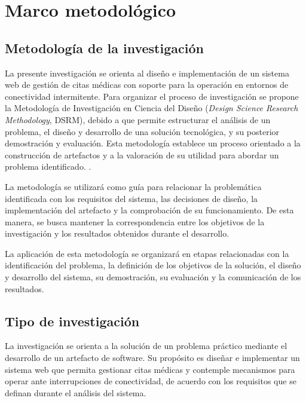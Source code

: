 
\section{Marco metodológico}
\label{sec:metodologia}

\subsection{Metodología de la investigación}

La presente investigación se orienta al diseño e implementación
de un sistema web de gestión de citas médicas con soporte para
la operación en entornos de conectividad intermitente. Para
organizar el proceso de investigación se propone la Metodología
de Investigación en Ciencia del Diseño
(\textit{Design Science Research Methodology}, DSRM), debido
a que permite estructurar el análisis de un problema, el diseño
y desarrollo de una solución tecnológica, y su posterior
demostración y evaluación. Esta metodología establece un proceso
orientado a la construcción de artefactos y a la valoración de
su utilidad para abordar un problema identificado.
\parencite{peffers2007dsrm}.

La metodología se utilizará como guía para relacionar la
problemática identificada con los requisitos del sistema, las
decisiones de diseño, la implementación del artefacto y la
comprobación de su funcionamiento. De esta manera, se busca
mantener la correspondencia entre los objetivos de la
investigación y los resultados obtenidos durante el desarrollo.

La aplicación de esta metodología se organizará en etapas
relacionadas con la identificación del problema, la definición
de los objetivos de la solución, el diseño y desarrollo del
sistema, su demostración, su evaluación y la comunicación de
los resultados.

\subsection{Tipo de investigación}

La investigación se orienta a la solución de un problema
práctico mediante el desarrollo de un artefacto de software.
Su propósito es diseñar e implementar un sistema web que
permita gestionar citas médicas y contemple mecanismos para
operar ante interrupciones de conectividad, de acuerdo con
los requisitos que se definan durante el análisis del sistema.

